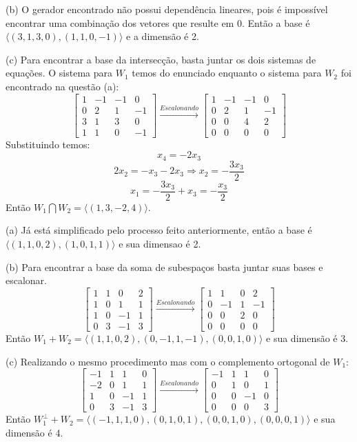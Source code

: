 \documentclass{homework}
\begin{document}
(b) O gerador encontrado não possui dependência lineares, pois é impossível encontrar uma combinação dos vetores que resulte em 0. Então a base é $\langle(3,1,3,0),(1,1,0,-1)\rangle$ e a dimensão é 2.

(c) Para encontrar a base da intersecção, basta juntar os dois sistemas de equações. O sistema para $W_1$ temos do enunciado enquanto o sistema para $W_2$ foi encontrado na questão (a):
\[
\begin{bmatrix}
1 & -1 & -1 & 0\\
0 & 2 & 1 & -1\\
3 & 1 & 3 & 0\\
1 & 1 & 0 & -1
\end{bmatrix} \xrightarrow{Escalonando}
\begin{bmatrix}
1 & -1 & -1 & 0\\
0 & 2 & 1 & -1\\
0 & 0 & 4 & 2\\
0 & 0 & 0 & 0
\end{bmatrix}
\]
Substituindo temos:
\[x_4 = -2x_3\]
\[2x_2 = -x_3 - 2x_3 \Rightarrow x_2 = -\frac{3x_3}{2}\]
\[x_1 = -\frac{3x_3}{2} + x_3 = -\frac{x_3}{2}\]
Então $W_1 \bigcap W_2 = \langle(1,3,-2,4)\rangle$.

\exercise*

(a) Já está simplificado pelo processo feito anteriormente, então a base é $\langle (1,1,0,2),(1,0,1,1)\rangle$ e sua dimensao é 2.

(b) Para encontrar a base da soma de subespaços basta juntar suas bases e escalonar.
\[
\begin{bmatrix}
1 & 1 & 0 & 2\\
1 & 0 & 1 & 1\\
1 & 0 & -1 & 1\\
0 & 3 & -1 & 3
\end{bmatrix} \xrightarrow{Escalonando}
\begin{bmatrix}
1 & 1 & 0 & 2\\
0 & -1 & 1 & -1\\
0 & 0 & 2 & 0\\
0 & 0 & 0 & 0
\end{bmatrix}
\]
Então $W_1 + W_2 = \langle(1,1,0,2),(0,-1,1,-1),(0,0,1,0)\rangle$ e sua dimensão é 3.

(c) Realizando o mesmo procedimento mas com o complemento ortogonal de $W_1$:
\[
\begin{bmatrix}
-1 & 1 & 1 & 0\\
-2 & 0 & 1 & 1\\
1 & 0 & -1 & 1\\
0 & 3 & -1 & 3
\end{bmatrix} \xrightarrow{Escalonando}
\begin{bmatrix}
-1 & 1 & 1 & 0\\
0 & 1 & 0 & 1\\
0 & 0 & -1 & 0\\
0 & 0 & 0 & 3
\end{bmatrix}
\]
Então $W_1^\perp + W_2 = \langle(-1,1,1,0),(0,1,0,1),(0,0,1,0),(0,0,0,1)\rangle$ e sua dimensão é 4.
\end{document}
